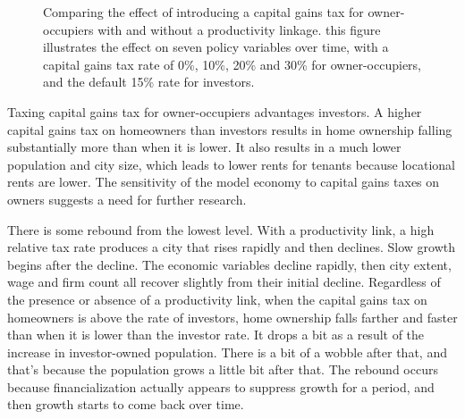 \begin{figure}[h!tb]
     \caption[Comparing the effect of introducing a capital gains tax for owner-occupiers with and without a productivity linkage]{Comparing the effect of introducing a capital gains tax for owner-occupiers with and without a productivity linkage. this figure illustrates the effect on seven policy variables over time, with a capital gains tax rate of 0\%, 10\%, 20\% and 30\% for owner-occupiers, and the default 15\% rate for investors.}
    \label{fig:CG-pers_link_W-WO-Cost-of-capital}
\end{figure}
Taxing capital gains tax for owner-occupiers advantages investors. 
A higher capital gains tax on homeowners than investors %
results in home ownership falling substantially more than when it is lower. It also results in a much lower population and city size, which leads to lower rents for tenants because locational rents are lower. The sensitivity of the model economy to capital gains taxes on owners suggests a need for further research. 

There is some rebound from the lowest level. 
With a productivity link, a high relative tax rate produces a city that rises rapidly and then declines. Slow growth begins after the decline. The economic variables decline rapidly, %
then city extent, wage and firm count all recover slightly from their initial decline. %
Regardless of the presence or absence of a productivity link, when the capital gains tax on homeowners is above the rate of investors, %
home ownership falls farther and faster than when it is lower than the investor rate. 
It drops a bit as a result of the increase in investor-owned population. There is a bit of a wobble after that, and that's because the population grows a little bit after that. The rebound occurs because financialization actually appears to suppress growth for a period, and then growth starts to come back over time. 


